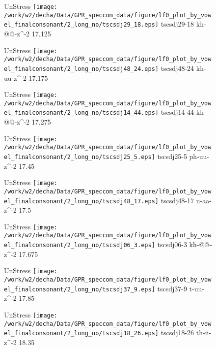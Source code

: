 \documentclass{article}
\begin{document}
\begin{figure}[t]
\begin{minipage}[b]{.24\textwidth}
UnStress
\centering
\texttt{[image: /work/w2/decha/Data/GPR\_speccom\_data/figure/lf0\_plot\_by\_vowel\_finalconsonant/2\_long\_no/tscsdj29\_18.eps]}
tscsdj29-18 kh-@@-z\textasciicircum-2 17.125
\end{minipage}
\begin{minipage}[b]{.24\textwidth}
UnStress
\centering
\texttt{[image: /work/w2/decha/Data/GPR\_speccom\_data/figure/lf0\_plot\_by\_vowel\_finalconsonant/2\_long\_no/tscsdj48\_24.eps]}
tscsdj48-24 kh-uu-z\textasciicircum-2 17.175
\end{minipage}
\begin{minipage}[b]{.24\textwidth}
UnStress
\centering
\texttt{[image: /work/w2/decha/Data/GPR\_speccom\_data/figure/lf0\_plot\_by\_vowel\_finalconsonant/2\_long\_no/tscsdj14\_44.eps]}
tscsdj14-44 kh-@@-z\textasciicircum-2 17.275
\end{minipage}
\begin{minipage}[b]{.24\textwidth}
UnStress
\centering
\texttt{[image: /work/w2/decha/Data/GPR\_speccom\_data/figure/lf0\_plot\_by\_vowel\_finalconsonant/2\_long\_no/tscsdj25\_5.eps]}
tscsdj25-5 ph-uu-z\textasciicircum-2 17.45
\end{minipage}
\end{figure}
\clearpage
\begin{figure}[t]
\begin{minipage}[b]{.24\textwidth}
UnStress
\centering
\texttt{[image: /work/w2/decha/Data/GPR\_speccom\_data/figure/lf0\_plot\_by\_vowel\_finalconsonant/2\_long\_no/tscsdj48\_17.eps]}
tscsdj48-17 n-aa-z\textasciicircum-2 17.5
\end{minipage}
\begin{minipage}[b]{.24\textwidth}
UnStress
\centering
\texttt{[image: /work/w2/decha/Data/GPR\_speccom\_data/figure/lf0\_plot\_by\_vowel\_finalconsonant/2\_long\_no/tscsdj06\_3.eps]}
tscsdj06-3 kh-@@-z\textasciicircum-2 17.675
\end{minipage}
\begin{minipage}[b]{.24\textwidth}
UnStress
\centering
\texttt{[image: /work/w2/decha/Data/GPR\_speccom\_data/figure/lf0\_plot\_by\_vowel\_finalconsonant/2\_long\_no/tscsdj37\_9.eps]}
tscsdj37-9 t-uu-z\textasciicircum-2 17.85
\end{minipage}
\begin{minipage}[b]{.24\textwidth}
UnStress
\centering
\texttt{[image: /work/w2/decha/Data/GPR\_speccom\_data/figure/lf0\_plot\_by\_vowel\_finalconsonant/2\_long\_no/tscsdj18\_26.eps]}
tscsdj18-26 th-ii-z\textasciicircum-2 18.35
\end{minipage}
\end{figure}
\end{document}
